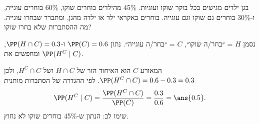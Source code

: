 בגן ילדים מגישים בכל בוקר שוקו ועוגיות. 45\% מהילדים בוחרים שוקו, 60\% בוחרים עוגייה, ו-30\% בוחרים גם שוקו וגם עוגייה. בוחרים באקראי ילד או ילדה מהגן, ומתברר שבחרו עוגייה. מה ההסתברות שלא בחרו שוקו?
\begin{solbox}
נסמן $H$ = ״בחר/ה שוקו״, $C$ = ״בחר/ה עוגייה״. נתון $\PP(C)=0.6$ ו-$\PP(H\cap C)=0.3$, ומחפשים את $\PP(H^C\mid C)$.

המאורע $C$ הוא האיחוד הזר של $H\cap C$ ושל $H^C\cap C$, ולכן $\PP(H^C\cap C)=0.6-0.3=0.3$. לפי ההגדרה של הסתברות מותנית
\[
\PP(H^C\mid C)=\frac{\PP(H^C\cap C)}{\PP(C)}=\frac{0.3}{0.6}=\ans{0.5}.
\]
שימו לב: הנתון ש-45\% בוחרים שוקו לא נחוץ.
\end{solbox}
